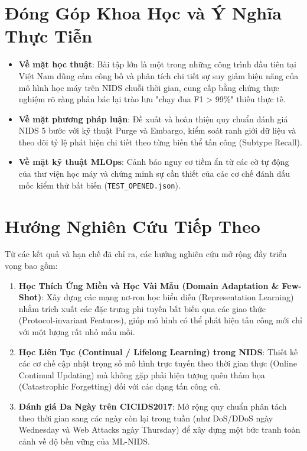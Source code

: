\section{Đóng Góp Khoa Học và Ý Nghĩa Thực Tiễn}

\begin{itemize}
    \item \textbf{Về mặt học thuật}: Bài tập lớn là một trong những công trình đầu tiên tại Việt Nam dũng cảm công bố và phân tích chi tiết sự suy giảm hiệu năng của mô hình học máy trên NIDS chuỗi thời gian, cung cấp bằng chứng thực nghiệm rõ ràng phản bác lại trào lưu "chạy đua F1 > 99\%" thiếu thực tế.
    \item \textbf{Về mặt phương pháp luận}: Đề xuất và hoàn thiện quy chuẩn đánh giá NIDS 5 bước với kỹ thuật Purge và Embargo, kiểm soát ranh giới dữ liệu và theo dõi tỷ lệ phát hiện chi tiết theo từng biến thể tấn công (Subtype Recall).
    \item \textbf{Về mặt kỹ thuật MLOps}: Cảnh báo nguy cơ tiềm ẩn từ các cờ tự động của thư viện học máy và chứng minh sự cần thiết của các cơ chế đánh dấu mốc kiểm thử bất biến (\texttt{TEST\_OPENED.json}).
\end{itemize}

\section{Hướng Nghiên Cứu Tiếp Theo}

Từ các kết quả và hạn chế đã chỉ ra, các hướng nghiên cứu mở rộng đầy triển vọng bao gồm:
\begin{enumerate}
    \item \textbf{Học Thích Ứng Miền và Học Vài Mẫu (Domain Adaptation \& Few-Shot)}: Xây dựng các mạng nơ-ron học biểu diễn (Representation Learning) nhằm trích xuất các đặc trưng phi tuyến bất biến qua các giao thức (Protocol-invariant Features), giúp mô hình có thể phát hiện tấn công mới chỉ với một lượng rất nhỏ mẫu mồi.
    \item \textbf{Học Liên Tục (Continual / Lifelong Learning) trong NIDS}: Thiết kế các cơ chế cập nhật trọng số mô hình trực tuyến theo thời gian thực (Online Continual Updating) mà không gặp phải hiện tượng quên thảm họa (Catastrophic Forgetting) đối với các dạng tấn công cũ.
    \item \textbf{Đánh giá Đa Ngày trên CICIDS2017}: Mở rộng quy chuẩn phân tách theo thời gian sang các ngày còn lại trong tuần (như DoS/DDoS ngày Wednesday và Web Attacks ngày Thursday) để xây dựng một bức tranh toàn cảnh về độ bền vững của ML-NIDS.
\end{enumerate}
